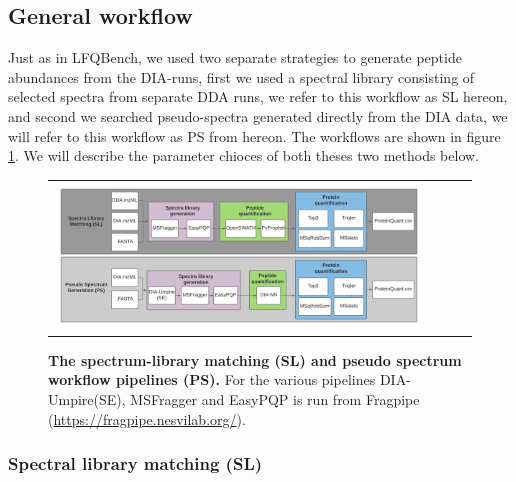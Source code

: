 \documentclass[10pt,letterpaper]{article}
\begin{document}
\subsection*{General workflow}

Just as in LFQBench, we used two separate strategies to generate peptide abundances from the DIA-runs, first we used a spectral library consisting of selected spectra from separate DDA runs, we refer to this workflow as SL hereon, and second we searched pseudo-spectra generated directly from the DIA data, we will refer to this workflow as PS from hereon. The workflows are shown in figure \ref{fig:flowchart}. We will describe the parameter chioces of both theses two methods below.

\begin{figure}[htp]
    \centering
    \begin{tabular}{lclc} 


        \includegraphics[width=1.0\linewidth]{../../result/report_plots/DIA_benchmark_truncated.png} 
    \end{tabular}

        \caption{{\bf The spectrum-library matching (SL) and pseudo spectrum workflow pipelines (PS).} For the various pipelines DIA-Umpire(SE), MSFragger and EasyPQP is run from Fragpipe (\protect\url{https://fragpipe.nesvilab.org/}).}
      \label{fig:flowchart}
\end{figure}



\subsubsection*{Spectral library matching (SL)}
\end{document}
